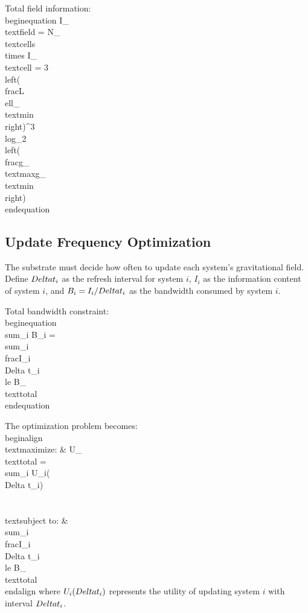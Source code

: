 \documentclass[twocolumn,prd,amsmath,amssymb,aps,superscriptaddress,nofootinbib]{revtex4-2}
\begin{document}
Total field information:
\\begin{equation}
I_{\\text{field}} = N_{\\text{cells}} \\times I_{\\text{cell}} = 3\\left(\\frac{L}{\\ell_{\\text{min}}}\\right)^3 \\log_2\\left(\\frac{g_{\\text{max}}}{g_{\\text{min}}}\\right)
\\end{equation}

\subsection{Update Frequency Optimization}

The substrate must decide how often to update each system's gravitational field. Define $\\Delta t_i$ as the refresh interval for system $i$, $I_i$ as the information content of system $i$, and $B_i = I_i/\\Delta t_i$ as the bandwidth consumed by system $i$.

Total bandwidth constraint:
\\begin{equation}
\\sum_i B_i = \\sum_i \\frac{I_i}{\\Delta t_i} \\le B_{\\text{total}}
\\end{equation}

The optimization problem becomes:
\\begin{align}
\\text{maximize: } & U_{\\text{total}} = \\sum_i U_i(\\Delta t_i) \\\\
\\text{subject to: }& \\sum_i \\frac{I_i}{\\Delta t_i} \\le B_{\\text{total}}
\\end{align}
where $U_i(\\Delta t_i)$ represents the utility of updating system $i$ with interval $\\Delta t_i$.
\end{document}
